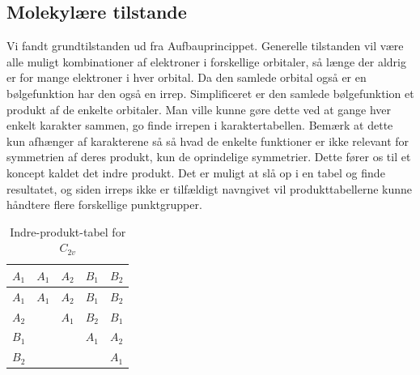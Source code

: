 \documentclass[../main.tex]{subfiles}
\begin{document}
\subsection{Molekylære tilstande}
Vi fandt grundtilstanden ud fra Aufbauprincippet. Generelle tilstanden vil være alle muligt kombinationer af elektroner i forskellige orbitaler, så længe der aldrig er for mange elektroner i hver orbital.
Da den samlede orbital også er en bølgefunktion har den også en irrep. Simplificeret er den samlede bølgefunktion et produkt af de enkelte orbitaler. Man ville kunne gøre dette ved at gange hver enkelt karakter sammen, go finde irrepen i karaktertabellen. Bemærk at dette kun afhænger af karakterene så så hvad de enkelte funktioner er ikke relevant for symmetrien af deres produkt, kun de oprindelige symmetrier. Dette fører os til et koncept kaldet det indre produkt. Det er muligt at slå op i en tabel og finde resultatet, og siden irreps ikke er tilfældigt navngivet vil produkttabellerne kunne håndtere flere forskellige punktgrupper.
\begin{table}[h]
    \centering
    \begin{tabular}{c|c c c c}
    $A_1$ & $A_1$ & $A_2$ & $B_1$ & $B_2$\\\hline
    $A_1$ & $A_1$ & $A_2$ & $B_1$ & $B_2$\\
    $A_2$ & &       $A_1$ & $B_2$ & $B_1$\\
    $B_1$ &       &       & $A_1$ & $A_2$\\
    $B_2$ &       &       &       & $A_1$
    \end{tabular}
    \caption{Indre-produkt-tabel for $C_{2v}$}
    \label{amo:tab:prodC2v}
\end{table}
\end{document}
